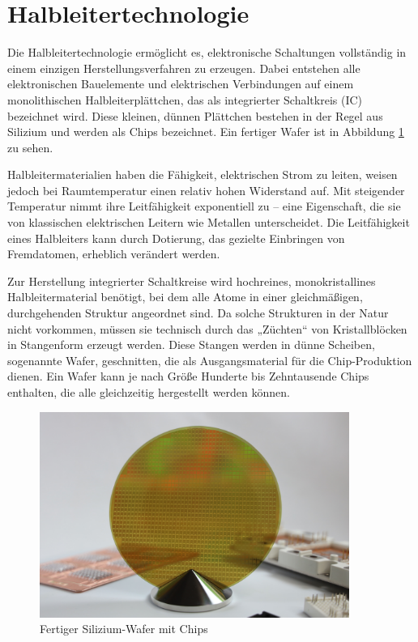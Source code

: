 \section{Halbleitertechnologie}

Die Halbleitertechnologie ermöglicht es, elektronische Schaltungen vollständig in einem einzigen Herstellungsverfahren zu erzeugen. Dabei entstehen alle elektronischen Bauelemente und elektrischen Verbindungen auf einem monolithischen Halbleiterplättchen, das als integrierter Schaltkreis (\ac{IC}) bezeichnet wird. Diese kleinen, dünnen Plättchen bestehen in der Regel aus Silizium und werden als Chips bezeichnet. Ein fertiger Wafer ist in Abbildung \ref{fig:Silizium-Wafer} zu sehen.

Halbleitermaterialien haben die Fähigkeit, elektrischen Strom zu leiten, weisen jedoch bei Raumtemperatur einen relativ hohen Widerstand auf. Mit steigender Temperatur nimmt ihre Leitfähigkeit exponentiell zu – eine Eigenschaft, die sie von klassischen elektrischen Leitern wie Metallen unterscheidet. Die Leitfähigkeit eines Halbleiters kann durch Dotierung, das gezielte Einbringen von Fremdatomen, erheblich verändert werden.

Zur Herstellung integrierter Schaltkreise wird hochreines, monokristallines Halbleitermaterial benötigt, bei dem alle Atome in einer gleichmäßigen, durchgehenden Struktur angeordnet sind. Da solche Strukturen in der Natur nicht vorkommen, müssen sie technisch durch das „Züchten“ von Kristallblöcken in Stangenform erzeugt werden. Diese Stangen werden in dünne Scheiben, sogenannte Wafer, geschnitten, die als Ausgangsmaterial für die Chip-Produktion dienen. Ein Wafer kann je nach Größe Hunderte bis Zehntausende Chips enthalten, die alle gleichzeitig hergestellt werden können.

\begin{figure}[!h]
    \centering
    \includegraphics[width=0.9\textwidth]{bilder/SiC-Wafer-Infineon.jpg}
    \caption{Fertiger Silizium-Wafer mit Chips}
    \label{fig:Silizium-Wafer}
\end{figure}

